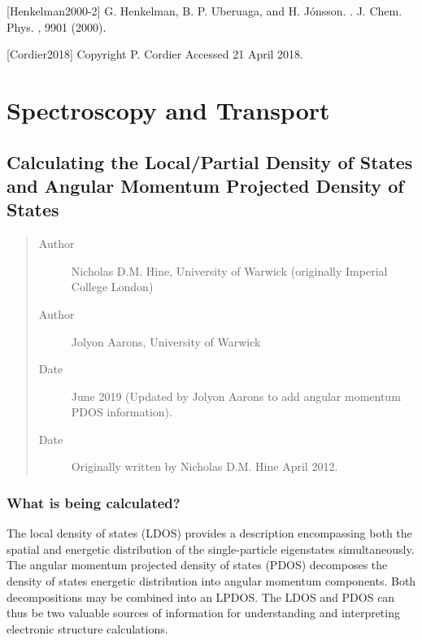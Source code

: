 \documentclass[letterpaper,10pt,english]{sphinxmanual}
\begin{document}
{[}Henkelman2000-2{]} G. Henkelman, B. P. Uberuaga, and H. Jónsson. . J. Chem. Phys. , 9901 (2000).

{[}Cordier2018{]} Copyright P. Cordier  Accessed 21 April 2018.


\chapter{Spectroscopy and Transport}
\label{\detokenize{index_spectroscopy::doc}}\label{\detokenize{index_spectroscopy:spectroscopy-and-transport}}

\section{Calculating the Local/Partial Density of States and Angular Momentum Projected Density of States}
\label{\detokenize{ldos_calculations::doc}}\label{\detokenize{ldos_calculations:calculating-the-local-partial-density-of-states-and-angular-momentum-projected-density-of-states}}\begin{quote}\begin{description}
\item[{Author}] \leavevmode
Nicholas D.M. Hine, University of Warwick (originally Imperial College London)

\item[{Author}] \leavevmode
Jolyon Aarons, University of Warwick

\item[{Date}] \leavevmode
June 2019 (Updated by Jolyon Aarons to add angular momentum PDOS information).

\item[{Date}] \leavevmode
Originally written by Nicholas D.M. Hine April 2012.

\end{description}\end{quote}


\subsection{What is being calculated?}
\label{\detokenize{ldos_calculations:what-is-being-calculated}}
The local density of states (LDOS) provides a description encompassing
both the spatial and energetic distribution of the single-particle
eigenstates simultaneously. The angular momentum projected density of
states (PDOS) decomposes the density of states energetic distribution
into angular momentum components. Both decompositions may be combined
into an LPDOS. The LDOS and PDOS can thus be two valuable sources of
information for understanding and interpreting electronic structure
calculations.
\end{document}
